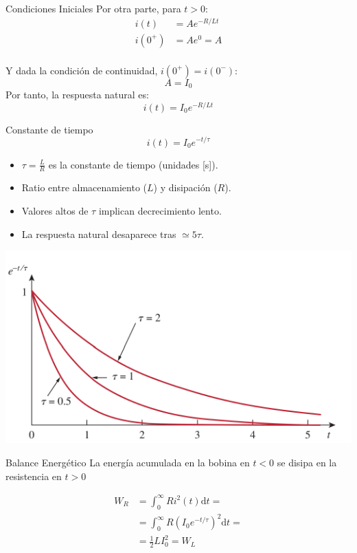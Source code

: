\documentclass[xcolor={usenames,svgnames,dvipsnames}]{beamer}
\begin{document}
\begin{frame}[label={sec:org135b779}]{Condiciones Iniciales}
Por otra parte, para \(t > 0\):
\begin{align*}
  i(t) &= A e^{-R/L t}\\
  i(0^+) &= A e^0 = A\\
\end{align*}

Y dada la condición de continuidad, \(i(0^+) = i(0^-)\):
\[
  A = I_0
\]
Por tanto, la respuesta natural es:
\[
  \boxed{i(t) = I_0 e^{-R/L t}}
\]
\end{frame}



\begin{frame}[label={sec:orga2a6608}]{Constante de tiempo}
\[
  \boxed{i(t) = I_0 e^{-t/\tau}}
\]

\begin{itemize}
\item \(\tau = \frac{L}{R}\) es la constante de tiempo (unidades [s]).
\item Ratio entre almacenamiento (\(L\)) y disipación (\(R\)).
\item Valores altos de \(\tau\) implican decrecimiento lento.
\item La respuesta natural \guillemotleft{}desaparece\guillemotright{} tras \(\simeq 5\tau\).
\end{itemize}
\begin{center}
\includegraphics[height=0.5\textheight]{figs/constante_tiempo.pdf}
\end{center}
\end{frame}

\begin{frame}[label={sec:orga5b0fb6}]{Balance Energético}
La energía acumulada en la bobina en \(t < 0\) se disipa en la resistencia en \(t > 0\)

\begin{align*}
  W_R &= \int_0^\infty R i^2(t)  \mathrm{d}t =\\
  &= \int_0^\infty R (I_0 e^{-t/\tau})^2  \mathrm{d}t = \\
  &= \frac{1}{2} L I_0^2 = W_L  
\end{align*}
\end{frame}
\end{document}
